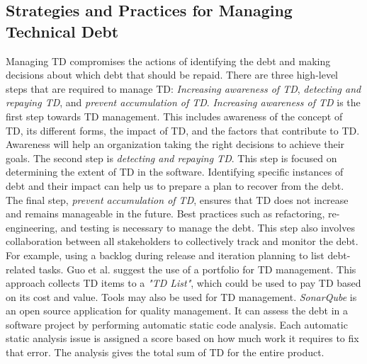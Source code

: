 \subsection{Strategies and Practices for Managing Technical Debt}
Managing TD compromises the actions of identifying the debt and making decisions about which debt that should be repaid\cite{fowler1999refactoring,krutchen,Zazworka:2011:PDD:1985362.1985372}. There are three high-level steps that are required to manage TD\cite{suryanarayana2014refactoring}: \textit{Increasing awareness of TD}, \textit{detecting and repaying TD}, and \textit{prevent accumulation of TD}. \textit{Increasing awareness of TD} is the first step towards TD management. This includes awareness of the concept of TD, its different forms, the impact of TD, and the factors that contribute to TD. Awareness will help an organization taking the right decisions to achieve their goals. The second step is \textit{detecting and repaying TD}. This step is focused on determining the extent of TD in the software. Identifying specific instances of debt and their impact can help us to prepare a plan to recover from the debt. The final step, \textit{prevent accumulation of TD}, ensures that TD does not increase and remains manageable in the future. Best practices such as refactoring, re-engineering, and testing is necessary to manage the debt\cite{p8-codabux}. This step also involves collaboration between all stakeholders to collectively track and monitor the debt. For example, using a backlog during release and iteration planning to list debt-related tasks\cite{krutchen}. Guo et al.\cite{p31-guo} suggest the use of a portfolio for TD management. This approach collects TD items to a \textit{"TD List"}, which could be used to pay TD based on its cost and value. Tools may also be used for TD management. \textit{SonarQube} is an open source application for quality management\cite{sonarsource2013sonarqube}. It can assess the debt in a software project by performing automatic static code analysis. Each automatic static analysis issue is assigned a score based on how much work it requires to fix that error. The analysis gives the total sum of TD for the entire product.









